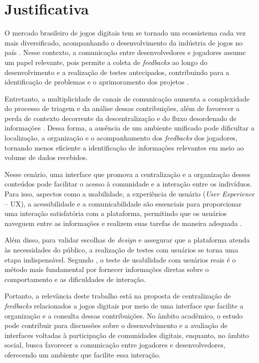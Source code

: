 \chapter{Justificativa} \label{cha:justificativa}


O mercado brasileiro de jogos digitais tem se tornado um ecossistema cada vez mais diversificado, acompanhando o desenvolvimento da indústria de jogos no país \cite{abragames2023}. Nesse contexto, a comunicação entre desenvolvedores e jogadores assume um papel relevante, pois permite a coleta de \textit{feedbacks} ao longo do desenvolvimento e a realização de testes antecipados, contribuindo para a identificação de problemas e o aprimoramento dos projetos \cite{bain2025}.

Entretanto, a multiplicidade de canais de comunicação aumenta a complexidade do processo de triagem e da análise dessas contribuições, além de favorecer a perda de contexto decorrente da descentralização e do fluxo desordenado de informações \cite{xiao2025}. Dessa forma, a ausência de um ambiente unificado pode dificultar a localização, a organização e o acompanhamento dos \textit{feedbacks} dos jogadores, tornando menos eficiente a identificação de informações relevantes em meio ao volume de dados recebidos.

Nesse cenário, uma interface que promova a centralização e a organização desses conteúdos pode facilitar o acesso à comunidade e a interação entre os indivíduos. Para isso, aspectos como a usabilidade, a experiência de usuário (\textit{User Experience} -- UX), a acessibilidade e a comunicabilidade são essenciais para proporcionar uma interação satisfatória com a plataforma, permitindo que os usuários naveguem entre as informações e realizem suas tarefas de maneira adequada \cite{barbosa2010}.

Além disso, para validar escolhas de \textit{design} e assegurar que a plataforma atenda às necessidades do público, a realização de testes com usuários se torna uma etapa indispensável. Segundo , o teste de usabilidade com usuários reais é o método mais fundamental por fornecer informações diretas sobre o comportamento e as dificuldades de interação. 

Portanto, a relevância deste trabalho está na proposta de centralização de \textit{feedbacks} relacionados a jogos digitais por meio de uma interface que facilite a organização e a consulta dessas contribuições. No âmbito acadêmico, o estudo pode contribuir para discussões sobre o desenvolvimento e a avaliação de interfaces voltadas à participação de comunidades digitais, enquanto, no âmbito social, busca favorecer a comunicação entre jogadores e desenvolvedores, oferecendo um ambiente que facilite essa interação.